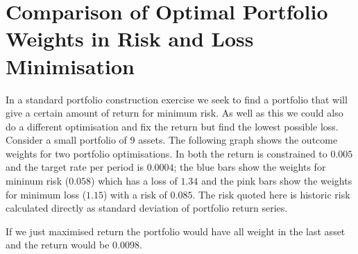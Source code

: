 \documentclass[12pt]{article}
\begin{document}
\section{Comparison of Optimal Portfolio Weights in Risk and Loss Minimisation}
In a standard portfolio construction exercise we seek to find a portfolio that will 
give a certain amount of return for minimum risk. As well as this we could also do a 
different optimisation and fix the 
return but find the lowest possible loss. Consider a small portfolio of 9 assets.
The following graph shows the outcome weights for two portfolio optimisations. In both the return is 
constrained to $0.005$ and the target rate per period is $0.0004$; the blue bars show the weights
for mininum risk ($0.058$) which has a loss of $1.34$ and the pink bars show
the weights for minimum loss ($1.15$) with a risk of $0.085$. The risk quoted here is historic risk 
calculated directly as standard deviation of portfolio return series.


If we just maximised return the portfolio would have all weight in the last 
asset and the return would be $0.0098$.
\end{document}
